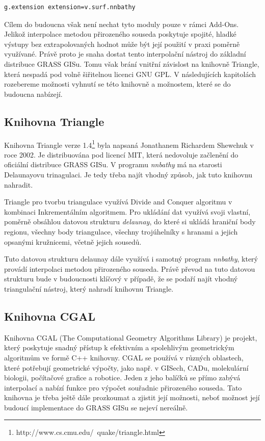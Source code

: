 \documentclass[12pt,a4paper]{article}
\begin{document}
\bigskip
\begin{lstlisting}[caption={Stáhnutí modulu v.surf.nnbathy pomocí g.extention}]
g.extension extension=v.surf.nnbathy
\end{lstlisting}

\bigskip
Cílem do budoucna však není nechat tyto moduly pouze v rámci Add-Ons. Jelikož interpolace metodou přirozeného souseda poskytuje spojité, hladké výstupy bez extrapolovaných hodnot může být její použití v praxi poměrně využívané. Právě proto je snaha dostat tento interpolační nástroj do základní distribuce GRASS GISu. Tomu však brání vnitřní závislost na knihovně Triangle, která nespadá pod volně šiřitelnou licenci GNU GPL. V následujících kapitolách rozebereme možnosti vyhnutí se této knihovně a možnostem, které se do budoucna nabízejí.

\newpage
\subsection{Knihovna Triangle}
Knihovna Triangle verze 1.4\footnote{http://www.cs.cmu.edu/~quake/triangle.html} byla napsaná Jonathanem Richardem Shewchuk v roce 2002. Je distribuována pod licencí MIT, která nedovoluje začlenění do oficiální distribuce GRASS GISu. V programu \textit{nnbathy} má na starosti Delaunayovu trinagulaci. Je tedy třeba najít vhodný způsob, jak tuto knihovnu nahradit.

Triangle pro tvorbu triangulace využívá Divide and Conquer algoritmu v kombinaci Inkrementálním algoritmem. Pro ukládání dat využívá svoji vlastní, poměrně obsáhlou datovou strukturu \textit{delaunay}, do které si ukládá hraniční body regionu, všechny body triangulace, všechny trojúhelníky s hranami a jejich opsanými kružnicemi, včetně jejich sousedů. 

Tuto datovou strukturu delaunay dále využívá i samotný program \textit{nnbathy}, který provádí interpolaci metodou přirozeného souseda. Právě převod na tuto datovou strukturu bude v budoucnosti klíčový v případě, že se podaří najít vhodný triangulační nástroj, který nahradí knihovnu Triangle.

\subsection{Knihovna CGAL}
Knihovna CGAL (The Computational Geometry Algorithms Library) je projekt, který poskytuje snadný přístup k efektivním a spolehlivým geometrickým algoritmům ve formě C++ knihovny. CGAL se používá v různých oblastech, které potřebují geometrické výpočty, jako např. v GISech, CADu, molekulární biologii, počítačové grafice a robotice. Jeden z jeho balíčků se přímo zabývá interpolací a nabízí funkce pro výpočet souřadnic přirozeného souseda. Tato knihovna je třeba ještě dále prozkoumat a zjistit její možnosti, neboť možnost její budoucí implementace do GRASS GISu se nejeví nereálně.
\end{document}
